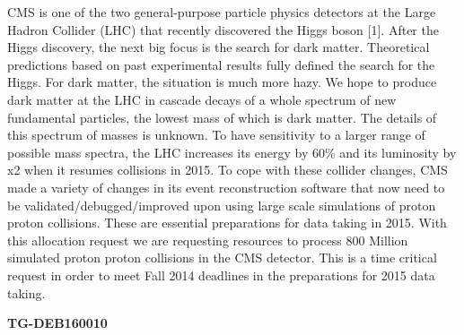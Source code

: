 CMS is one of the two general-purpose particle physics detectors at the
Large Hadron Collider (LHC) that recently discovered the Higgs boson
{[}1{]}. After the Higgs discovery, the next big focus is the search for
dark matter. Theoretical predictions based on past experimental results
fully defined the search for the Higgs. For dark matter, the situation
is much more hazy. We hope to produce dark matter at the LHC in cascade
decays of a whole spectrum of new fundamental particles, the lowest mass
of which is dark matter. The details of this spectrum of masses is
unknown. To have sensitivity to a larger range of possible mass spectra,
the LHC increases its energy by 60\% and its luminosity by x2 when it
resumes collisions in 2015. To cope with these collider changes, CMS
made a variety of changes in its event reconstruction software that now
need to be validated/debugged/improved upon using large scale
simulations of proton proton collisions. These are essential
preparations for data taking in 2015. With this allocation request we
are requesting resources to process 800 Million simulated proton proton
collisions in the CMS detector. This is a time critical request in order
to meet Fall 2014 deadlines in the preparations for 2015 data taking.

\textbf{TG-DEB160010}

